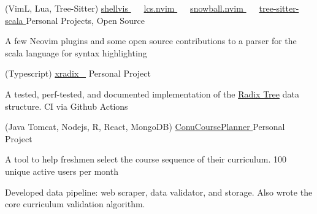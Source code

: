 


\begin{cventries}


\cventry
  {(VimL, Lua, Tree-Sitter)}
  {
    \href{https://github.com/stumash/shellvis}{shellvis \faGithubSquare}\ \ \
    \href{https://github.com/stumash/lcs.nvim}{lcs.nvim \faGithubSquare}\ \ \
    \href{https://github.com/stumash/snowball.nvim}{snowball.nvim \faGithubSquare}\ \ \
    \href{https://github.com/tree-sitter/tree-sitter-scala/pulls?q=is\%3Apr+is\%3Aclosed+author\%3Astumash}{tree-sitter-scala \faGithubSquare}
  }
  {Personal Projects, Open Source}
  {}
  {
    \begin{cvitems}
    \item {A few Neovim plugins and some open source contributions to a parser for the scala language for syntax highlighting}
    \end{cvitems}
  }


\cventry
  {(Typescript)} %
  {\href{https://github.com/stumash/xradix}{xradix \ \faGithubSquare\acvHeaderIconSep} \href{https://stumash.github.io/xradix/}{\faMap}} %
  {Personal Project} %
  {} %
  { %
    \begin{cvitems}
    \item {A tested, perf-tested, and documented implementation of the \textcolor{darkblue}{\href{https://en.wikipedia.org/wiki/Radix_tree}{Radix Tree}} data structure. CI via Github Actions }
    \end{cvitems}
  }


\cventry
  {(Java Tomcat, Nodejs, R, React, MongoDB)} %
  {\href{http://conucourseplanner.online}{ConuCoursePlanner \color{darkblue}{\faLink}} \href{https://github.com/stumash/CoursePlanner}{\faGithubSquare\acvHeaderIconSep}} %
  {Personal Project} %
  {} %
  { %
    \begin{cvitems}
    \item {A tool to help freshmen select the course sequence of their curriculum. 100 unique active users per month}
    \item {Developed data pipeline: web scraper, data validator, and storage. Also wrote the core curriculum validation algorithm.}
    \end{cvitems}
  }


\end{cventries}
